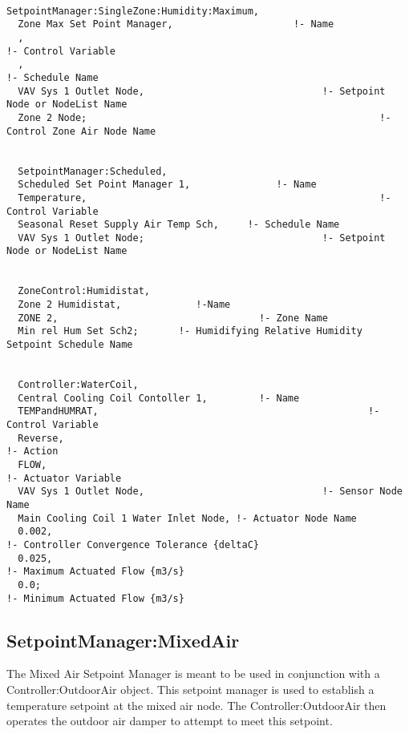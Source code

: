 \begin{lstlisting}

SetpointManager:SingleZone:Humidity:Maximum,
  Zone Max Set Point Manager,                     !- Name
  ,                                                                         !- Control Variable
  ,                                                                         !- Schedule Name
  VAV Sys 1 Outlet Node,                               !- Setpoint Node or NodeList Name
  Zone 2 Node;                                                   !-Control Zone Air Node Name


  SetpointManager:Scheduled,
  Scheduled Set Point Manager 1,               !- Name
  Temperature,                                                   !- Control Variable
  Seasonal Reset Supply Air Temp Sch,     !- Schedule Name
  VAV Sys 1 Outlet Node;                               !- Setpoint Node or NodeList Name


  ZoneControl:Humidistat,
  Zone 2 Humidistat,             !-Name
  ZONE 2,                                   !- Zone Name
  Min rel Hum Set Sch2;       !- Humidifying Relative Humidity Setpoint Schedule Name


  Controller:WaterCoil,
  Central Cooling Coil Contoller 1,         !- Name
  TEMPandHUMRAT,                                               !- Control Variable
  Reverse,                                                           !- Action
  FLOW,                                                                 !- Actuator Variable
  VAV Sys 1 Outlet Node,                               !- Sensor Node Name
  Main Cooling Coil 1 Water Inlet Node, !- Actuator Node Name
  0.002,                                                               !- Controller Convergence Tolerance {deltaC}
  0.025,                                                               !- Maximum Actuated Flow {m3/s}
  0.0;                                                                   !- Minimum Actuated Flow {m3/s}
\end{lstlisting}

\subsection{SetpointManager:MixedAir}\label{setpointmanagermixedair}

The Mixed Air Setpoint Manager is meant to be used in conjunction with a Controller:OutdoorAir object. This setpoint manager is used to establish a temperature setpoint at the mixed air node. The Controller:OutdoorAir then operates the outdoor air damper to attempt to meet this setpoint.

